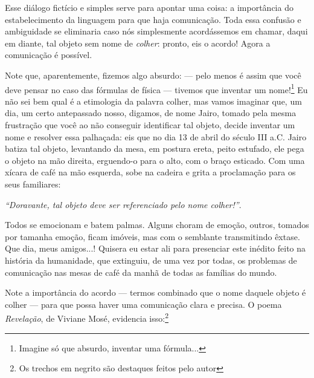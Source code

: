 Esse diálogo fictício e simples serve para apontar uma coisa: a importância do estabelecimento da linguagem para que haja comunicação. Toda essa confusão e ambiguidade se eliminaria caso nós simplesmente acordássemos em chamar, daqui em diante, tal objeto sem nome de \textit{colher}: pronto, eis o acordo! Agora a comunicação é possível. 

Note que, aparentemente, fizemos algo absurdo: --- pelo menos é assim que você deve pensar no caso das fórmulas de física --- tivemos que inventar um nome!\footnote{Imagine só que absurdo, inventar uma fórmula...} Eu não sei bem qual é a etimologia da palavra colher, mas vamos imaginar que, um dia, um certo antepassado nosso, digamos, de nome Jairo, tomado pela mesma frustração que você ao não conseguir identificar tal objeto, decide inventar um nome e resolver essa palhaçada: eis que no dia 13 de abril do século III a.C. Jairo batiza tal objeto, levantando da mesa, em postura ereta, peito estufado, ele pega o objeto na mão direita, erguendo-o para o alto, com o braço esticado. Com uma xícara de café na mão esquerda, sobe na cadeira e grita a proclamação para os seus familiares:

\begin{center}
  \textit{``Doravante, tal objeto deve ser referenciado pelo nome \textit{colher!''}}.    
\end{center}

Todos se emocionam e batem palmas. Alguns choram de emoção, outros, tomados por tamanha emoção, ficam imóveis, mas com o semblante transmitindo êxtase. Que dia, meus amigos...! Quisera eu estar ali para presenciar este inédito feito na história da humanidade, que extinguiu, de uma vez por todas, os problemas de comunicação nas mesas de café da manhã de todas as famílias do mundo.

Note a importância do acordo --- termos combinado que o nome daquele objeto é colher --- para que possa haver uma comunicação clara e precisa. O poema \textit{Revelação}, de Viviane Mosé, evidencia isso:\footnote{Os trechos em negrito são destaques feitos pelo autor}


